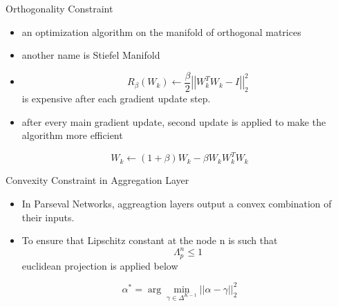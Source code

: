 \documentclass{beamer}		%
\begin{document}
\begin{frame}{Orthogonality Constraint}
\begin{definition}
\begin{itemize}
    \item an optimization algorithm on the manifold of orthogonal matrices
    \item another name is Stiefel Manifold
    \item \[R_{\beta}\left ( W_{k} \right )\leftarrow \frac{\beta}{2}\left | \left |W _{k}^{T}W_{k} - I \right | \right |_{2}^{2}\]is expensive after each gradient update step.
    \item after every main gradient update, second update is applied to make the algorithm more efficient
\end{itemize}
\end{definition}
\pause
\[W_{k}\leftarrow (1+\beta )W_{k}-\beta W_{k}W_{k}^{T}W_{k}\]

\end{frame}	
\begin{frame}{Convexity Constraint in Aggregation Layer}
\begin{definition}
\begin{itemize}
    \item In Parseval Networks, aggreagtion layers output a convex combination of their inputs.
    \item To ensure that Lipschitz constant at the node n is such that\[ \Lambda _{p}^{n}\leq 1\]
    euclidean projection is applied below
\end{itemize}

\end{definition}
\[\alpha^{*}=\arg \min _{\gamma \in \Delta ^{K-1}}\left | \left | \alpha-\gamma \right | \right |_{2}^{2}\]
\end{frame}
\end{document}
